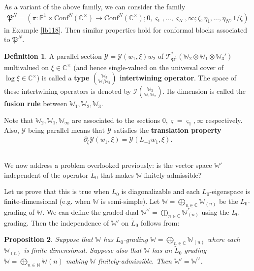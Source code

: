 \documentclass[12pt,a4paper,notitlepage]{article}
\theoremstyle{definition}
\newtheorem{df}{Definition}[section]
\theoremstyle{plain}
\newtheorem{pp}[df]{Proposition}
\newcommand{\fk}{\mathfrak}
\newcommand{\mc}{\mathcal}
\newcommand{\wtd}{\widetilde}
\newcommand{\Conf}{\mathrm{Conf}}
\newcommand{\scr}{\mathscr}
\newcommand{\sgm}{\varsigma}
\newcommand{\Wbb}{\mathbb W}
\newcommand{\Cbb}{\mathbb C}
\newcommand{\Nbb}{\mathbb N}
\newcommand{\Pbb}{\mathbb P}
\numberwithin{equation}{section}
\begin{document}
As a variant of the above family, we can consider the family
\begin{align*}
\fk P^N=(\pi:\Pbb^1\times\Conf^N(\Cbb^\times)\rightarrow\Conf^N(\Cbb^\times);0,\sgm_1,\dots,\sgm_N,\infty;\zeta,\eta_1,\dots,\eta_N,1/\zeta)
\end{align*}
in Example \ref{lb118}. Then similar properties hold for conformal blocks associated to $\fk P^N$.

\begin{df}
A  parallel section $\mc Y=\mc Y(w_1,\xi)w_2$ of $\scr T_{\fk P^1}^*(\Wbb_2\otimes\Wbb_1\otimes \Wbb_3')$ multivalued on $\xi\in\Cbb^\times$ (and hence single-valued on the universal cover of $\log\xi\in\Cbb^\times$) is called a \textbf{type $\Wbb_3\choose \Wbb_1\Wbb_2$ intertwining operator}. The space of these intertwining operators is denoted by $\mc I{\Wbb_3\choose \Wbb_1\Wbb_2}$. Its dimension is called the \textbf{fusion rule} between $\Wbb_1,\Wbb_2,\Wbb_3$.
\end{df}
Note that $\Wbb_2,\Wbb_1,\Wbb_\infty$ are associated to the sections $0,\sgm=\sgm_1,\infty$ respectively. Also, $\mc Y$ being parallel means that $\mc Y$ satisfies the \textbf{translation property}
\begin{align}
\partial_\xi\mc Y(w_1,\xi)=\mc Y(L_{-1}w_1,\xi).
\end{align}






\subsection{}


We now address a problem overlooked previously: is the vector space $\Wbb'$ independent of the operator $\wtd L_0$ that makes $\Wbb$ finitely-admissible?

Let us prove that this is true when $L_0$ is diagonalizable and each $L_0$-eigenspace is finite-dimensional (e.g. when $\Wbb$ is semi-simple).  Let $\Wbb=\bigoplus_{n\in\Cbb}\Wbb_{(n)}$ be the $L_0$-grading of $\Wbb$. We can define the graded dual $\Wbb^\vee=\bigoplus_{n\in\Cbb}\Wbb_{(n)}^*$ using the $L_0$-grading. Then the independence of $\Wbb'$ on $\wtd L_0$ follows from:

\begin{pp}
Suppose that $\Wbb$ has $L_0$-grading $\Wbb=\bigoplus_{n\in\Cbb}\Wbb_{(n)}$ where each $\Wbb_{(n)}$ is finite-dimensional. Suppose also that $\Wbb$ has an $\wtd L_0$-grading $\Wbb=\bigoplus_{n\in\Nbb}\Wbb(n)$ making $\Wbb$ finitely-admissible. Then $\Wbb'=\Wbb^\vee$.
\end{pp}
\end{document}
